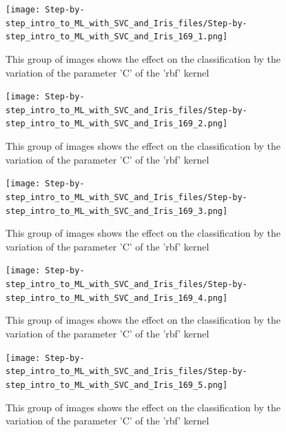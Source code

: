 \documentclass [oneside,10pt,a4paper,ngerman,BCOR10mm,headsepline,parindent,final]{scrartcl}
\begin{document}
    \begin{figure}
        \begin{center}\texttt{[image: Step-by-step\_intro\_to\_ML\_with\_SVC\_and\_Iris\_files/Step-by-step\_intro\_to\_ML\_with\_SVC\_and\_Iris\_169\_1.png]}\end{center}
        \caption{This group of images shows the effect on the classification by the variation of the parameter 'C' of the 'rbf' kernel}
        \label{fig:vary_c_parameter}
    \end{figure}
    
    \begin{figure}
        \begin{center}\texttt{[image: Step-by-step\_intro\_to\_ML\_with\_SVC\_and\_Iris\_files/Step-by-step\_intro\_to\_ML\_with\_SVC\_and\_Iris\_169\_2.png]}\end{center}
        \caption{This group of images shows the effect on the classification by the variation of the parameter 'C' of the 'rbf' kernel}
        \label{fig:vary_c_parameter}
    \end{figure}
    
    \begin{figure}
        \begin{center}\texttt{[image: Step-by-step\_intro\_to\_ML\_with\_SVC\_and\_Iris\_files/Step-by-step\_intro\_to\_ML\_with\_SVC\_and\_Iris\_169\_3.png]}\end{center}
        \caption{This group of images shows the effect on the classification by the variation of the parameter 'C' of the 'rbf' kernel}
        \label{fig:vary_c_parameter}
    \end{figure}
    
    \begin{figure}
        \begin{center}\texttt{[image: Step-by-step\_intro\_to\_ML\_with\_SVC\_and\_Iris\_files/Step-by-step\_intro\_to\_ML\_with\_SVC\_and\_Iris\_169\_4.png]}\end{center}
        \caption{This group of images shows the effect on the classification by the variation of the parameter 'C' of the 'rbf' kernel}
        \label{fig:vary_c_parameter}
    \end{figure}
    
    \begin{figure}
        \begin{center}\texttt{[image: Step-by-step\_intro\_to\_ML\_with\_SVC\_and\_Iris\_files/Step-by-step\_intro\_to\_ML\_with\_SVC\_and\_Iris\_169\_5.png]}\end{center}
        \caption{This group of images shows the effect on the classification by the variation of the parameter 'C' of the 'rbf' kernel}
        \label{fig:vary_c_parameter}
    \end{figure}
    
\end{document}
